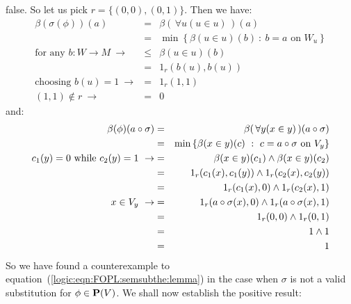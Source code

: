 false. So let us pick $r=\{(0,0),(0,1)\}$. Then we have:
    \begin{eqnarray*}
    \beta(\sigma(\phi))(a)&=&\beta(\,\forall u(u\in u)\,)(a)\\
    &=&\min\left\{\beta(u\in u)(b)\ :\ b=a\mbox{\ on\ }W_{u}\right\}\\
    \mbox{for any\ }b:W\to M\ \rightarrow&\leq&\beta(u\in u)(b)\\
    &=&1_{r}(b(u),b(u))\\
    \mbox{choosing\ }b(u)=1\ \rightarrow&=&1_{r}(1,1)\\
    (1,1)\not\in r\ \rightarrow&=&0
    \end{eqnarray*}
and:
    \begin{eqnarray*}
    \beta(\phi)(a\circ\sigma)&=&\beta(\,\forall y(x\in y)\,)(a\circ\sigma)\\
    &=&\min\left\{\beta(x\in y)(c)\ :\ c=a\circ\sigma\mbox{\ on\
    }V_{y}\right\}\\
    c_{1}(y)=0\mbox{\ while\ }c_{2}(y)=1\ \rightarrow
    &=&\beta(x\in y)(c_{1})\land\beta(x\in y)(c_{2})\\
    &=&1_{r}(c_{1}(x),c_{1}(y))\land 1_{r}(c_{2}(x),c_{2}(y))\\
    &=&1_{r}(c_{1}(x),0)\land 1_{r}(c_{2}(x),1)\\
    x\in V_{y}\ \rightarrow
    &=&1_{r}(a\circ\sigma(x),0)\land 1_{r}(a\circ\sigma(x),1)\\
    &=&1_{r}(0,0)\land 1_{r}(0,1)\\
    &=& 1\land 1\\
    &=&1
    \end{eqnarray*}
So we have found a counterexample to
equation~(\ref{logic:eqn:FOPL:semsubthe:lemma}) in the case when
$\sigma$ is not a valid substitution for $\phi\in\mbox{${\bf P}(V)$}$. We shall now
establish the positive result:

